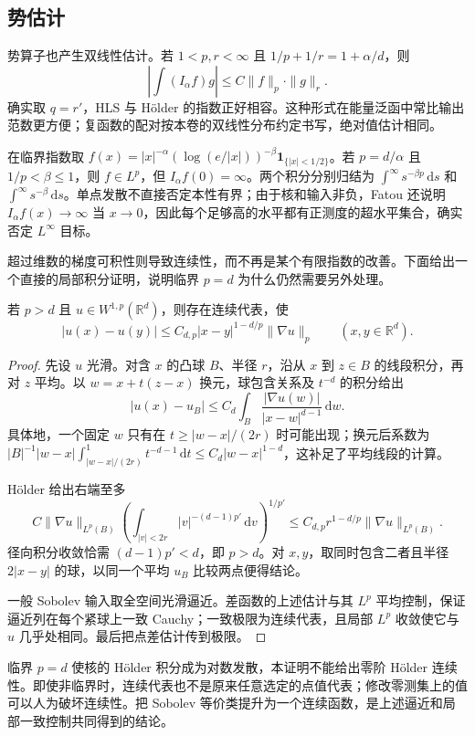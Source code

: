 \subsection{势估计}
\label{b2:subsec:190203}

势算子也产生双线性估计。若 \(1<p,r<\infty\) 且 \(1/p+1/r=1+\alpha/d\)，则
\[
 \left|\int (I_\alpha f)g\right|
 \leq C\|f\|_p\cdot\|g\|_r.
\]
确实取 \(q=r'\)，HLS 与 Hölder 的指数正好相容。这种形式在能量泛函中常比输出范数更方便；复函数的配对按本卷的双线性分布约定书写，绝对值估计相同。

\ProseParagraphBreak

在临界指数取 \(f(x)=|x|^{-\alpha}(\log(e/|x|))^{-\beta}\mathbf1_{\{|x|<1/2\}}\)。若 \(p=d/\alpha\) 且 \(1/p<\beta\leq1\)，则 \(f\in L^p\)，但 \(I_\alpha f(0)=\infty\)。两个积分分别归结为 \(\int^\infty s^{-\beta p}\,\mathrm ds\) 和 \(\int^\infty s^{-\beta}\,\mathrm ds\)。单点发散不直接否定本性有界；由于核和输入非负，Fatou 还说明 \(I_\alpha f(x)\to\infty\) 当 \(x\to0\)，因此每个足够高的水平都有正测度的超水平集合，确实否定 \(L^\infty\) 目标。

超过维数的梯度可积性则导致连续性，而不再是某个有限指数的改善。下面给出一个直接的局部积分证明，说明临界 \(p=d\) 为什么仍然需要另外处理。
\begin{proposition}\label{b2:prop:19-morrey}
若 \(p>d\) 且 \(u\in W^{1,p}(\mathbb R^d)\)，则存在连续代表，使
\[
 |u(x)-u(y)|\leq C_{d,p}|x-y|^{1-d/p}\|\nabla u\|_p
 \qquad(x,y\in\mathbb R^d).
\]
\end{proposition}
\begin{proof}
先设 \(u\) 光滑。对含 \(x\) 的凸球 \(B\)、半径 \(r\)，沿从 \(x\) 到 \(z\in B\) 的线段积分，再对 \(z\) 平均。以 \(w=x+t(z-x)\) 换元，球包含关系及 \(t^{-d}\) 的积分给出
\[
 |u(x)-u_B|\leq C_d\int_B
 \frac{|\nabla u(w)|}{|x-w|^{d-1}}\,\mathrm dw.
\]
具体地，一个固定 \(w\) 只有在 \(t\geq|w-x|/(2r)\) 时可能出现；换元后系数为
\(|B|^{-1}|w-x|\int_{|w-x|/(2r)}^1t^{-d-1}\,\mathrm dt
\leq C_d|w-x|^{1-d}\)，这补足了平均线段的计算。

Hölder 给出右端至多
\[
 C\|\nabla u\|_{L^p(B)}
 \left(\int_{|v|<2r}|v|^{-(d-1)p'}\,\mathrm dv\right)^{1/p'}
 \leq C_{d,p}r^{1-d/p}\|\nabla u\|_{L^p(B)}.
\]
径向积分收敛恰需 \((d-1)p'<d\)，即 \(p>d\)。对 \(x,y\)，取同时包含二者且半径 \(2|x-y|\) 的球，以同一个平均 \(u_B\) 比较两点便得结论。

一般 Sobolev 输入取全空间光滑逼近。差函数的上述估计与其 \(L^p\) 平均控制，保证逼近列在每个紧球上一致 Cauchy；一致极限为连续代表，且局部 \(L^p\) 收敛使它与 \(u\) 几乎处相同。最后把点差估计传到极限。
\end{proof}
临界 \(p=d\) 使核的 Hölder 积分成为对数发散，本证明不能给出零阶 Hölder 连续性。即使非临界时，连续代表也不是原来任意选定的点值代表；修改零测集上的值可以人为破坏连续性。把 Sobolev 等价类提升为一个连续函数，是上述逼近和局部一致控制共同得到的结论。

